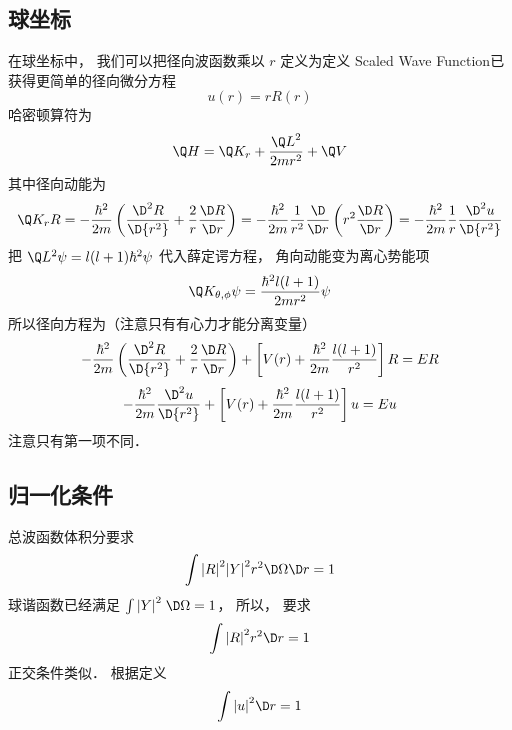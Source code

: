 
\subsection{球坐标}

在球坐标中， 我们可以把径向波函数乘以 $r$  定义为定义 Scaled Wave Function已获得更简单的径向微分方程
 \begin{equation}
  u(r) = rR(r)
\end{equation}
哈密顿算符为
 \begin{equation}
  \Q H = {\Q K_r} + \frac{{\Q L}^2}{2m{r^2}} + \Q V
\end{equation}
其中径向动能为
 \begin{equation}
 {\Q K_r}R =  - \frac{\hbar ^2}{2m}\left( {\frac{{\D ^2}R}{\D {r^2}} + \frac{2}{r}\frac{\D R}{\D r}} \right) =  - \frac{\hbar ^2}{2m}\frac{1}{r^2}\frac{\D }{\D r}\left( {{r^2}\frac{\D R}{\D r}} \right) =  - \frac{\hbar ^2}{2m}\frac{1}{r}\frac{{\D ^2}u}{\D {r^2}}
\end{equation}
把 ${\Q L^2}\psi  = l(l + 1){\hbar ^2}\psi $  代入薛定谔方程， 角向动能变为离心势能项
 \begin{equation}
{\Q K_{\theta ,\phi }}\psi  = \frac{{\hbar ^2}l(l + 1)}{2m{r^2}}\psi 
\end{equation}
所以径向方程为（注意只有有心力才能分离变量）
 \begin{equation}
  - \frac{\hbar ^2}{2m}\left( {\frac{{\D ^2}R}{\D {r^2}} + \frac{2}{r}\frac{\D R}{\D r}} \right) + \left[ {V(r) + \frac{\hbar ^2}{2m}\frac{l(l + 1)}{r^2}} \right]R = ER
\end{equation}
 \begin{equation}
   - \frac{\hbar ^2}{2m}\frac{{\D ^2}u}{\D {r^2}} + \left[ {V(r) + \frac{\hbar ^2}{2m}\frac{l(l + 1)}{r^2}} \right]u = Eu
\end{equation}
注意只有第一项不同．


\subsection{归一化条件}

总波函数体积分要求
 \begin{equation}
  \int {{{\left| R \right|}^2}{{\left| Y \right|}^2}{r^2}\D \Omega \D r}  = 1
\end{equation}
球谐函数已经满足 $\int {{{\left| Y \right|}^2}\;\D \Omega }  = 1$，  所以， 要求
 \begin{equation}
  \int {{{\left| R \right|}^2}{r^2}\D r}  = 1
\end{equation}
正交条件类似． 根据定义
 \begin{equation}
  \int {{{\left| u \right|}^2}\D r}  = 1
\end{equation}


